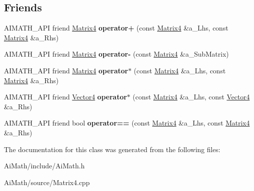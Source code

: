 \subsection*{Friends}
\begin{DoxyCompactItemize}
\item 
\hypertarget{class_ai_math_1_1_matrix4_ac976a4466ab8f066ac2a194ad2d17852}{A\+I\+M\+A\+T\+H\+\_\+\+A\+P\+I friend \hyperlink{class_ai_math_1_1_matrix4}{Matrix4} {\bfseries operator+} (const \hyperlink{class_ai_math_1_1_matrix4}{Matrix4} \&a\+\_\+\+Lhs, const \hyperlink{class_ai_math_1_1_matrix4}{Matrix4} \&a\+\_\+\+Rhs)}\label{class_ai_math_1_1_matrix4_ac976a4466ab8f066ac2a194ad2d17852}

\item 
\hypertarget{class_ai_math_1_1_matrix4_af6cfdf157be34a5064c3d2e63eb07dc8}{A\+I\+M\+A\+T\+H\+\_\+\+A\+P\+I friend \hyperlink{class_ai_math_1_1_matrix4}{Matrix4} {\bfseries operator-\/} (const \hyperlink{class_ai_math_1_1_matrix4}{Matrix4} \&a\+\_\+\+Sub\+Matrix)}\label{class_ai_math_1_1_matrix4_af6cfdf157be34a5064c3d2e63eb07dc8}

\item 
\hypertarget{class_ai_math_1_1_matrix4_ac06a3fa1fbc3dd0f709752b44e0ca9df}{A\+I\+M\+A\+T\+H\+\_\+\+A\+P\+I friend \hyperlink{class_ai_math_1_1_matrix4}{Matrix4} {\bfseries operator$\ast$} (const \hyperlink{class_ai_math_1_1_matrix4}{Matrix4} \&a\+\_\+\+Lhs, const \hyperlink{class_ai_math_1_1_matrix4}{Matrix4} \&a\+\_\+\+Rhs)}\label{class_ai_math_1_1_matrix4_ac06a3fa1fbc3dd0f709752b44e0ca9df}

\item 
\hypertarget{class_ai_math_1_1_matrix4_a479ff77a8292f80c14bcba62453a1e75}{A\+I\+M\+A\+T\+H\+\_\+\+A\+P\+I friend \hyperlink{class_ai_math_1_1_vector4}{Vector4} {\bfseries operator$\ast$} (const \hyperlink{class_ai_math_1_1_matrix4}{Matrix4} \&a\+\_\+\+Lhs, const \hyperlink{class_ai_math_1_1_vector4}{Vector4} \&a\+\_\+\+Rhs)}\label{class_ai_math_1_1_matrix4_a479ff77a8292f80c14bcba62453a1e75}

\item 
\hypertarget{class_ai_math_1_1_matrix4_aeea552e194263794db0c797e48a4ff5f}{A\+I\+M\+A\+T\+H\+\_\+\+A\+P\+I friend bool {\bfseries operator==} (const \hyperlink{class_ai_math_1_1_matrix4}{Matrix4} \&a\+\_\+\+Lhs, const \hyperlink{class_ai_math_1_1_matrix4}{Matrix4} \&a\+\_\+\+Rhs)}\label{class_ai_math_1_1_matrix4_aeea552e194263794db0c797e48a4ff5f}

\end{DoxyCompactItemize}


The documentation for this class was generated from the following files\+:\begin{DoxyCompactItemize}
\item 
Ai\+Math/include/Ai\+Math.\+h\item 
Ai\+Math/source/Matrix4.\+cpp\end{DoxyCompactItemize}
